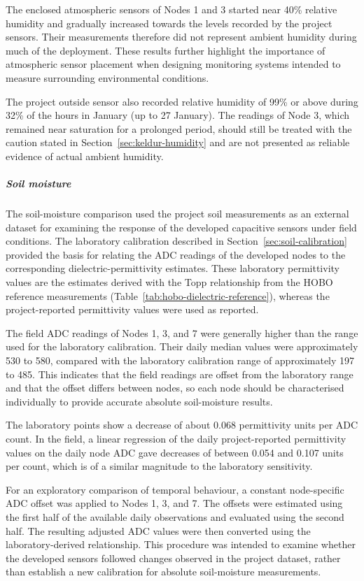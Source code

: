 The enclosed atmospheric sensors of Nodes 1 and 3 started near 40\% relative humidity and gradually increased towards the levels recorded by the project sensors. Their measurements therefore did not represent ambient humidity during much of the deployment. These results further highlight the importance of atmospheric sensor placement when designing monitoring systems intended to measure surrounding environmental conditions.

The project outside sensor also recorded relative humidity of 99\% or above during 32\% of the hours in January (up to 27 January). The readings of Node 3, which remained near saturation for a prolonged period, should still be treated with the caution stated in Section~\ref{sec:keldur-humidity} and are not presented as reliable evidence of actual ambient humidity.

\subparagraph{Soil moisture}

The soil-moisture comparison used the project soil measurements as an external dataset for examining the response of the developed capacitive sensors under field conditions. The laboratory calibration described in Section~\ref{sec:soil-calibration} provided the basis for relating the ADC readings of the developed nodes to the corresponding dielectric-permittivity estimates. These laboratory permittivity values are the estimates derived with the Topp relationship from the HOBO reference measurements (Table~\ref{tab:hobo-dielectric-reference}), whereas the project-reported permittivity values were used as reported.

The field ADC readings of Nodes 1, 3, and 7 were generally higher than the range used for the laboratory calibration. Their daily median values were approximately 530 to 580, compared with the laboratory calibration range of approximately 197 to 485. This indicates that the field readings are offset from the laboratory range and that the offset differs between nodes, so each node should be characterised individually to provide accurate absolute soil-moisture results.

The laboratory points show a decrease of about 0.068 permittivity units per ADC count. In the field, a linear regression of the daily project-reported permittivity values on the daily node ADC gave decreases of between 0.054 and 0.107 units per count, which is of a similar magnitude to the laboratory sensitivity.

For an exploratory comparison of temporal behaviour, a constant node-specific ADC offset was applied to Nodes 1, 3, and 7. The offsets were estimated using the first half of the available daily observations and evaluated using the second half. The resulting adjusted ADC values were then converted using the laboratory-derived relationship. This procedure was intended to examine whether the developed sensors followed changes observed in the project dataset, rather than establish a new calibration for absolute soil-moisture measurements.

